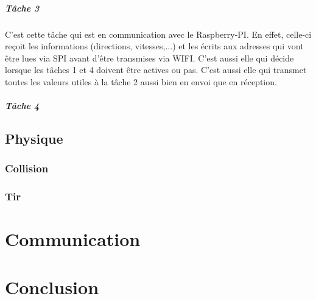 \paragraph{Tâche 3}

C'est cette tâche qui est en communication avec le Raspberry-PI. En effet, celle-ci reçoit les informations (directions, vitesses,...) et les écrits aux adresses qui vont être lues via SPI avant d'être transmises via WIFI. C'est aussi elle qui décide lorsque les tâches 1 et 4 doivent être actives ou pas. C'est aussi elle qui transmet toutes les valeurs  utiles à la tâche 2 aussi bien en envoi que en réception. 

\paragraph{Tâche 4}














\section{Physique}
	\subsection{Collision}
	\subsection{Tir}

\chapter{Communication}
\chapter{Conclusion}
